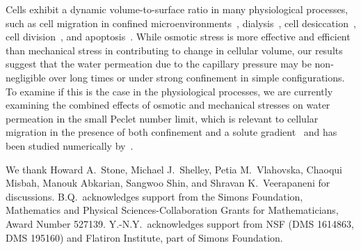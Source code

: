 \documentclass[prb,preprint,showpacs,preprintnumbers,amsmath,amssymb,longbibliography]{revtex4-1}
\begin{document}
Cells exhibit a dynamic volume-to-surface ratio in 
many physiological processes, such as 
cell migration in confined microenvironments~\cite{StrokaJiangChenEtAl2014_Cell, papadopoulos2008aquaporins}, 
dialysis~\cite{wan2006}, cell desiccation~\cite{vogl2014effect}, cell
division~\cite{OdermattMiettinenKangEtAl2020_bioRxiv}, and
apoptosis~\cite{marchetti1996mitochondrial}. While osmotic stress  is
more effective and efficient than mechanical stress in contributing to
change in cellular volume, our results suggest that the water permeation
due to the capillary pressure may be non-negligible over long times or
under strong confinement in simple configurations.  To examine if this
is the case in the physiological processes, we are currently examining
the combined effects of osmotic and mechanical stresses on water
permeation in the small Peclet number limit, which is relevant to
cellular migration in the presence of both confinement and a solute
gradient~\cite{StrokaJiangChenEtAl2014_Cell} and has been studied
numerically by~\citet{jae-car-med-try1999}.


\acknowledgments
We thank Howard A.~Stone, Michael J.~Shelley, Petia M.~Vlahovska,
Chaoqui Misbah, Manouk Abkarian, Sangwoo Shin, and Shravan
K.~Veerapaneni for discussions. B.Q.~acknowledges support from the
Simons Foundation, Mathematics and Physical Sciences-Collaboration
Grants for Mathematicians, Award Number 527139.  Y.-N.Y.~acknowledges
support from NSF (DMS 1614863, DMS 195160) and Flatiron Institute, part
of Simons Foundation.

\bigskip
 

\end{document}
